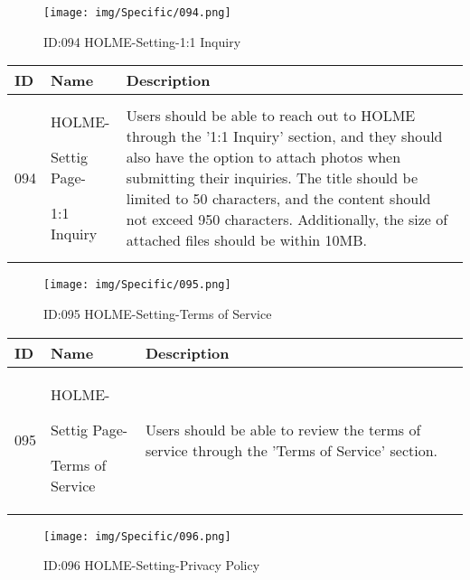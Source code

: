 \documentclass[conference]{IEEEtran}
\begin{document}
\begin{enumerate}
\begin{figure}[h]
\centering                                         
\texttt{[image: img/Specific/094.png]}
\caption{ID:094 HOLME-Setting-1:1 Inquiry}
\end{figure}
\begin{table}[h]
\def\arraystretch{1.2} \small
    \begin{tabular}{|p{1cm}|p{1.8cm}|p{5.0cm}|}
        \hline
        ID & Name & Description\\ \hline
         094 \par  & HOLME-\par Settig Page- \par 1:1 Inquiry& Users should be able to reach out to HOLME through the '1:1 Inquiry' section, and they should also have the option to attach photos when submitting their inquiries. The title should be limited to 50 characters, and the content should not exceed 950 characters. Additionally, the size of attached files should be within 10MB.
         \\ \hline
    \end{tabular}
\end{table}
\begin{figure}[h]
\centering                                         
\texttt{[image: img/Specific/095.png]}
\caption{ID:095 HOLME-Setting-Terms of Service}
\end{figure}
\begin{table}[h]
\def\arraystretch{1.2} \small
    \begin{tabular}{|p{1cm}|p{1.8cm}|p{5.0cm}|}
        \hline
        ID & Name & Description\\ \hline
         095 \par  & HOLME-\par Settig Page- \par Terms of Service& 
       	Users should be able to review the terms of service through the 'Terms of Service' section.
         \\ \hline
    \end{tabular}
\end{table}
\begin{figure}[h]
\centering                                         
\texttt{[image: img/Specific/096.png]}
\caption{ID:096 HOLME-Setting-Privacy Policy}
\end{figure}
\begin{table}[h]
\def\arraystretch{1.2} \small
    \begin{tabular}{|p{1cm}|p{1.8cm}|p{5.0cm}|}

\end{tabular}
\end{table}
\end{enumerate}
\end{document}
